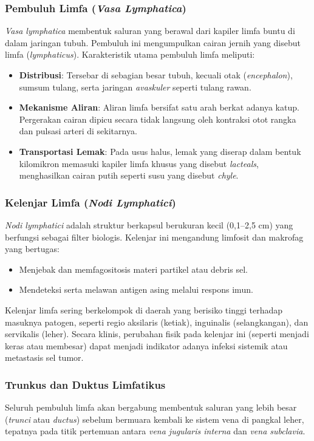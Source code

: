 \subsubsection{Pembuluh Limfa (\textit{Vasa Lymphatica})}
\textit{Vasa lymphatica} membentuk saluran yang berawal dari kapiler limfa buntu di dalam jaringan tubuh. Pembuluh ini mengumpulkan cairan jernih yang disebut limfa (\textit{lymphaticus}). Karakteristik utama pembuluh limfa meliputi:
\begin{itemize}
    \item \textbf{Distribusi}: Tersebar di sebagian besar tubuh, kecuali otak (\textit{encephalon}), sumsum tulang, serta jaringan \textit{avaskuler} seperti tulang rawan.
    \item \textbf{Mekanisme Aliran}: Aliran limfa bersifat satu arah berkat adanya katup. Pergerakan cairan dipicu secara tidak langsung oleh kontraksi otot rangka dan pulsasi arteri di sekitarnya.
    \item \textbf{Transportasi Lemak}: Pada usus halus, lemak yang diserap dalam bentuk kilomikron memasuki kapiler limfa khusus yang disebut \textit{lacteals}, menghasilkan cairan putih seperti susu yang disebut \textit{chyle}.
\end{itemize}



\subsubsection{Kelenjar Limfa (\textit{Nodi Lymphatici})}
\textit{Nodi lymphatici} adalah struktur berkapsul berukuran kecil (0,1--2,5 cm) yang berfungsi sebagai filter biologis. Kelenjar ini mengandung limfosit dan makrofag yang bertugas:
\begin{itemize}
    \item Menjebak dan memfagositosis materi partikel atau debris sel.
    \item Mendeteksi serta melawan antigen asing melalui respons imun.
\end{itemize}

Kelenjar limfa sering berkelompok di daerah yang berisiko tinggi terhadap masuknya patogen, seperti regio aksilaris (ketiak), inguinalis (selangkangan), dan servikalis (leher). Secara klinis, perubahan fisik pada kelenjar ini (seperti menjadi keras atau membesar) dapat menjadi indikator adanya infeksi sistemik atau metastasis sel tumor.

\subsubsection{Trunkus dan Duktus Limfatikus}
Seluruh pembuluh limfa akan bergabung membentuk saluran yang lebih besar (\textit{trunci} atau \textit{ductus}) sebelum bermuara kembali ke sistem vena di pangkal leher, tepatnya pada titik pertemuan antara \textit{vena jugularis interna} dan \textit{vena subclavia}.

